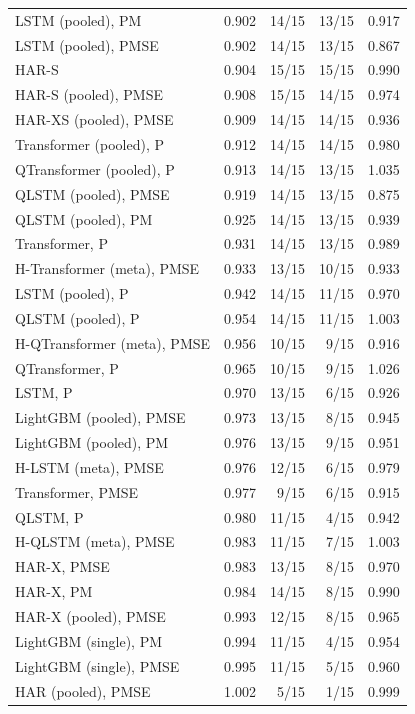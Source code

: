 \begin{tabular}{lrrrr}
LSTM (pooled), PM & 0.902 & 14/15 & 13/15 & 0.917 \\
LSTM (pooled), PMSE & 0.902 & 14/15 & 13/15 & 0.867 \\
HAR-S & 0.904 & 15/15 & 15/15 & 0.990 \\
HAR-S (pooled), PMSE & 0.908 & 15/15 & 14/15 & 0.974 \\
HAR-XS (pooled), PMSE & 0.909 & 14/15 & 14/15 & 0.936 \\
Transformer (pooled), P & 0.912 & 14/15 & 14/15 & 0.980 \\
QTransformer (pooled), P & 0.913 & 14/15 & 13/15 & 1.035 \\
QLSTM (pooled), PMSE & 0.919 & 14/15 & 13/15 & 0.875 \\
QLSTM (pooled), PM & 0.925 & 14/15 & 13/15 & 0.939 \\
Transformer, P & 0.931 & 14/15 & 13/15 & 0.989 \\
H-Transformer (meta), PMSE & 0.933 & 13/15 & 10/15 & 0.933 \\
LSTM (pooled), P & 0.942 & 14/15 & 11/15 & 0.970 \\
QLSTM (pooled), P & 0.954 & 14/15 & 11/15 & 1.003 \\
H-QTransformer (meta), PMSE & 0.956 & 10/15 & 9/15 & 0.916 \\
QTransformer, P & 0.965 & 10/15 & 9/15 & 1.026 \\
LSTM, P & 0.970 & 13/15 & 6/15 & 0.926 \\
LightGBM (pooled), PMSE & 0.973 & 13/15 & 8/15 & 0.945 \\
LightGBM (pooled), PM & 0.976 & 13/15 & 9/15 & 0.951 \\
H-LSTM (meta), PMSE & 0.976 & 12/15 & 6/15 & 0.979 \\
Transformer, PMSE & 0.977 & 9/15 & 6/15 & 0.915 \\
QLSTM, P & 0.980 & 11/15 & 4/15 & 0.942 \\
H-QLSTM (meta), PMSE & 0.983 & 11/15 & 7/15 & 1.003 \\
HAR-X, PMSE & 0.983 & 13/15 & 8/15 & 0.970 \\
HAR-X, PM & 0.984 & 14/15 & 8/15 & 0.990 \\
HAR-X (pooled), PMSE & 0.993 & 12/15 & 8/15 & 0.965 \\
LightGBM (single), PM & 0.994 & 11/15 & 4/15 & 0.954 \\
LightGBM (single), PMSE & 0.995 & 11/15 & 5/15 & 0.960 \\
HAR (pooled), PMSE & 1.002 & 5/15 & 1/15 & 0.999 \\

\end{tabular}

